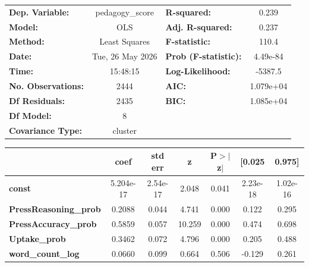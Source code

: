 \begin{center}
\begin{tabular}{lclc}
\toprule
\textbf{Dep. Variable:}        & pedagogy\_score  & \textbf{  R-squared:         } &     0.239   \\
\textbf{Model:}                &       OLS        & \textbf{  Adj. R-squared:    } &     0.237   \\
\textbf{Method:}               &  Least Squares   & \textbf{  F-statistic:       } &     110.4   \\
\textbf{Date:}                 & Tue, 26 May 2026 & \textbf{  Prob (F-statistic):} &  4.49e-84   \\
\textbf{Time:}                 &     15:48:15     & \textbf{  Log-Likelihood:    } &   -5387.5   \\
\textbf{No. Observations:}     &        2444      & \textbf{  AIC:               } & 1.079e+04   \\
\textbf{Df Residuals:}         &        2435      & \textbf{  BIC:               } & 1.085e+04   \\
\textbf{Df Model:}             &           8      & \textbf{                     } &             \\
\textbf{Covariance Type:}      &     cluster      & \textbf{                     } &             \\
\bottomrule
\end{tabular}
\begin{tabular}{lcccccc}
                               & \textbf{coef} & \textbf{std err} & \textbf{z} & \textbf{P$> |$z$|$} & \textbf{[0.025} & \textbf{0.975]}  \\
\midrule
\textbf{const}                 &    5.204e-17  &     2.54e-17     &     2.048  &         0.041        &     2.23e-18    &     1.02e-16     \\
\textbf{PressReasoning\_prob}  &       0.2088  &        0.044     &     4.741  &         0.000        &        0.122    &        0.295     \\
\textbf{PressAccuracy\_prob}   &       0.5859  &        0.057     &    10.259  &         0.000        &        0.474    &        0.698     \\
\textbf{Uptake\_prob}          &       0.3462  &        0.072     &     4.796  &         0.000        &        0.205    &        0.488     \\
\textbf{word\_count\_log}      &       0.0660  &        0.099     &     0.664  &         0.506        &       -0.129    &        0.261     \\

\end{tabular}
\end{center}
